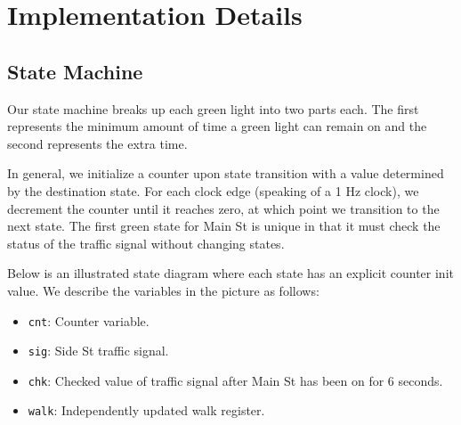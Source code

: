 \documentclass[11pt]{article}
\begin{document}
\section{Implementation Details}
\subsection{State Machine}
Our state machine breaks up each green light into two parts each. The first represents the minimum amount of time a green light can remain on and the second represents the extra time. 

In general, we initialize a counter upon state transition with a value determined by the destination state. For each clock edge (speaking of a 1 Hz clock), we decrement the counter until it reaches zero, at which point we transition to the next state. The first green state for Main St is unique in that it must check the status of the traffic signal without changing states. 

Below is an illustrated state diagram where each state has an explicit counter init value. We describe the variables in the picture as follows:
\begin{itemize}
	\item \texttt{cnt}: Counter variable.
	\item \texttt{sig}: Side St traffic signal.
	\item \texttt{chk}: Checked value of traffic signal after Main St has been on for 6 seconds.
	\item \texttt{walk}: Independently updated walk register. 
\end{itemize}
\end{document}

